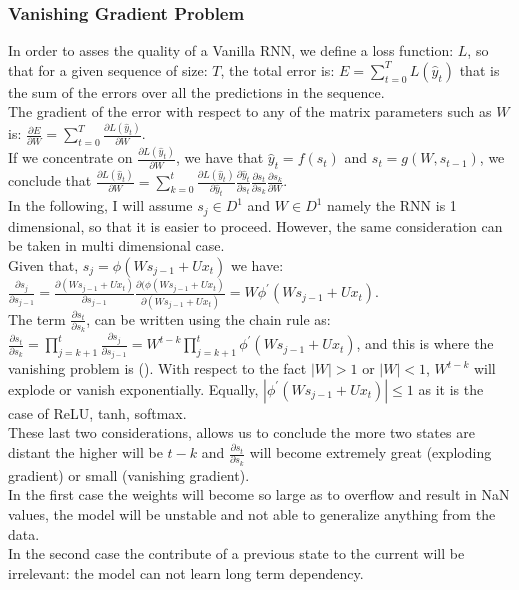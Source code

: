 \documentclass[LaM,binding=0.6cm]{sapthesis}
\begin{document}
\subsubsection{Vanishing Gradient Problem}
In order to asses the quality of a Vanilla RNN, we define a loss function: $L$, so that for a given sequence of size: $T$, the total error is: $E=\sum_{t=0}^{T}L(\hat{y}_t)$ that is the sum of the errors over all the predictions in the sequence.\\The gradient of the error with respect to any of the matrix parameters such as $W$ is: $\frac{\partial E}{\partial W}=\sum_{t=0}^{T}\frac{\partial L(\hat{y}_t)}{\partial W}$.\\If we concentrate on $\frac{\partial L(\hat{y}_t)}{\partial W}$, we have that $\hat{y}_t=f(s_t)$ and $s_t=g(W,s_{t-1})$, we conclude that $\frac{\partial L(\hat{y}_t)}{\partial W} = \sum_{k=0}^t \frac{\partial L(\hat{y}_t)}{\partial \hat{y}_t} \frac{\partial \hat{y}_t}{\partial {s}_t} \frac{\partial s_t}{\partial {s}_k} \frac{\partial s_k}{\partial W} $.\\In the following, I will assume $s_j \in D^1$ and $W \in D^1$ namely the RNN is 1 dimensional, so that it is easier to proceed. However, the same consideration can be taken in multi dimensional case.\\Given that, $s_j=\phi(Ws_{j-1}+Ux_t)$ we have:
$\frac{\partial s_j}{\partial s_{j-1}}= \frac{\partial(Ws_{j-1}+Ux_t)}{\partial s_{j-1}} \frac{\partial(\phi(Ws_{j-1}+Ux_t)}{\partial (Ws_{j-1}+Ux_t)} = W \phi^{'}(Ws_{j-1}+Ux_t)$.\\The term $\frac{\partial s_t}{\partial {s}_k}$, can be written using the chain rule as: $\frac{\partial s_t}{\partial {s}_k}=\prod_{j=k+1}^{t}\frac{\partial s_j}{\partial s_{j-1}}=W^{t-k}\prod_{j=k+1}^{t}\phi^{'}\left(Ws_{j-1}+Ux_t\right)$, and this is where the vanishing problem is (\cite{vanprob}). With respect to the fact $|W|>1$ or $|W|<1$, $W^{t-k}$ will explode or vanish exponentially. Equally, $\left|\phi^{'}(Ws_{j-1}+Ux_t)\right|\leq1$ as it is the case of ReLU, tanh, softmax.\\These last two considerations, allows us to conclude the more two states are distant the higher will be $t-k$ and $\frac{\partial s_t}{\partial {s}_k}$ will become extremely great (exploding gradient) or small (vanishing gradient).\\In the first case the weights will become so large as to overflow and result in NaN values, the model will be unstable and not able to generalize anything from the data.\\In the second case the contribute of a previous state to the current will be irrelevant: the model can not learn long term dependency.
\end{document}
